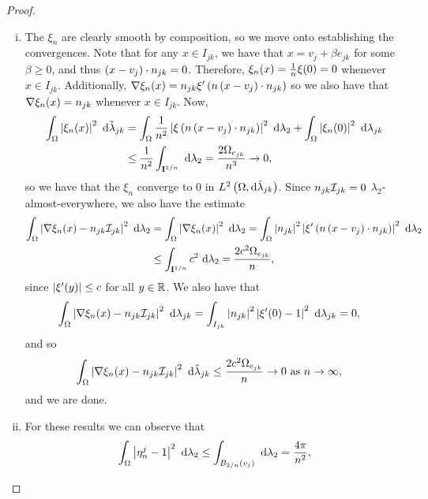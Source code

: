 \begin{proof}
	\begin{enumerate}[(i)]
		\item The $\xi_n$ are clearly smooth by composition, so we move onto establishing the convergences.
		Note that for any $x\in I_{jk}$, we have that $x = v_j + \beta e_{jk}$ for some $\beta\geq0$, and thus $\left( x-v_j \right)\cdot n_{jk} = 0$.
		Therefore, $\xi_n(x) = \frac{1}{n}\xi(0) = 0$ whenever $x\in I_{jk}$.
		Additionally, $\nabla\xi_n(x) = n_{jk}\xi'\left( n\left( x-v_j \right)\cdot n_{jk} \right)$ so we also have that $\nabla\xi_n(x) = n_{jk}$ whenever $x\in I_{jk}$.
		Now,
		\begin{align*}
			\int_{\Omega} \left\lvert \xi_n(x) \right\rvert^2  \ \mathrm{d}\tilde{\lambda}_{jk}
			&= \int_{\Omega} \frac{1}{n^2}\left\lvert \xi\left( n\left( x-v_j \right)\cdot n_{jk} \right) \right\rvert^2  \ \mathrm{d}\lambda_2
			+ \int_{\Omega} \left\lvert \xi_n(0) \right\rvert^2  \ \mathrm{d}\lambda_{jk} \\
			&\leq \frac{1}{n^2}\int_{\mathbf{I}^{1/n}}  \ \mathrm{d}\lambda_2 = \frac{2\Omega_{e_{jk}}}{n^3} \rightarrow 0,
		\end{align*}
		so we have that the $\xi_n$ converge to 0 in $L^{2}\left( \Omega,\mathrm{d}\tilde{\lambda}_{jk} \right)$.
		Since $n_{jk}\mathcal{I}_{jk}=0$ $\lambda_2$-almost-everywhere, we also have the estimate
		\begin{align*}
			\int_{\Omega} \left\lvert  \nabla\xi_n(x) - n_{jk}\mathcal{I}_{jk}  \right\rvert^2  \ \mathrm{d}\lambda_2
			&= \int_{\Omega} \left\lvert  \nabla\xi_n(x)  \right\rvert^2  \ \mathrm{d}\lambda_2
			= \int_{\Omega} \left\lvert n_{jk} \right\rvert^2\left\lvert \xi'\left( n\left( x-v_j \right)\cdot n_{jk} \right) \right\rvert^2  \ \mathrm{d}\lambda_2 \\
			&\leq \int_{\mathbf{I}^{1/n}} c^2  \ \mathrm{d}\lambda_2 
			= \frac{2c^2\Omega_{e_{jk}}}{n},
		\end{align*}
		since $\left\lvert \xi'(y) \right\rvert\leq c$ for all $y\in\mathbb{R}$.
		We also have that
		\begin{align*}
			\int_{\Omega} \left\lvert  \nabla\xi_n(x) - n_{jk}\mathcal{I}_{jk}  \right\rvert^2  \ \mathrm{d}\lambda_{jk}
			&= \int_{I_{jk}} \left\lvert n_{jk} \right\rvert^2\left\lvert  \xi'(0)-1  \right\rvert^2  \ \mathrm{d}\lambda_{jk} = 0,
		\end{align*}
		and so
		\begin{align*}
			\int_{\Omega} \left\lvert  \nabla\xi_n(x) - n_{jk}\mathcal{I}_{jk}  \right\rvert^2  \ \mathrm{d}\tilde{\lambda}_{jk}
			&\leq \frac{2c^2\Omega_{e_{jk}}}{n} \rightarrow 0 \ \text{as} \ n \rightarrow\infty,
		\end{align*}
		and we are done.
		\item For these results we can observe that
		\begin{align*}
			\integral{\ddom}{\abs{ \eta_n^j - 1 }^2}{\lambda_2}
			&\leq \integral{B_{2/n}(v_j)}{}{\lambda_2} = \frac{4\pi}{n^2}, \\

\end{align*}
\end{enumerate}
\end{proof}
